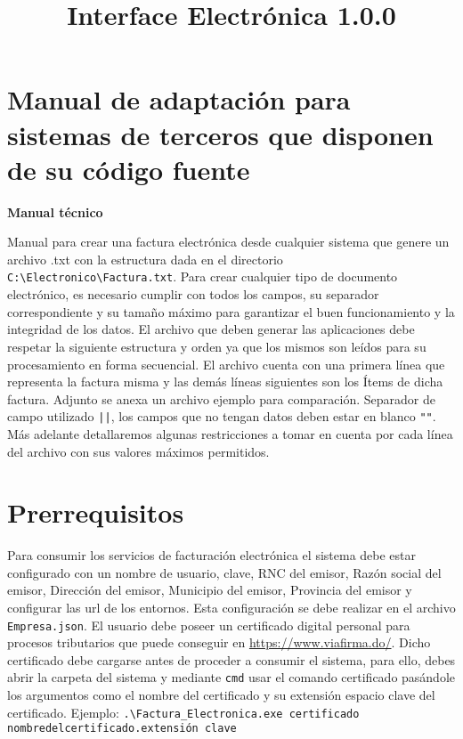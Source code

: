 \documentclass{article}
\title{Interface Electrónica 1.0.0}
\author{}
\date{}
\begin{document}
\maketitle

\section*{Manual de adaptación para sistemas de terceros que disponen de su código fuente}
\textbf{Manual técnico}

Manual para crear una factura electrónica desde cualquier sistema que genere un archivo .txt con la estructura dada en el directorio \texttt{C:\textbackslash Electronico\textbackslash Factura.txt}. Para crear cualquier tipo de documento electrónico, es necesario cumplir con todos los campos, su separador correspondiente y su tamaño máximo para garantizar el buen funcionamiento y la integridad de los datos. El archivo que deben generar las aplicaciones debe respetar la siguiente estructura y orden ya que los mismos son leídos para su procesamiento en forma secuencial. El archivo cuenta con una primera línea que representa la factura misma y las demás líneas siguientes son los Ítems de dicha factura. Adjunto se anexa un archivo ejemplo para comparación. Separador de campo utilizado \texttt{||}, los campos que no tengan datos deben estar en blanco \texttt{""}. Más adelante detallaremos algunas restricciones a tomar en cuenta por cada línea del archivo con sus valores máximos permitidos.

\section*{Prerrequisitos}
Para consumir los servicios de facturación electrónica el sistema debe estar configurado con un nombre de usuario, clave, RNC del emisor, Razón social del emisor, Dirección del emisor, Municipio del emisor, Provincia del emisor y configurar las url de los entornos. Esta configuración se debe realizar en el archivo \texttt{Empresa.json}. El usuario debe poseer un certificado digital personal para procesos tributarios que puede conseguir en \url{https://www.viafirma.do/}. Dicho certificado debe cargarse antes de proceder a consumir el sistema, para ello, debes abrir la carpeta del sistema y mediante \texttt{cmd} usar el comando certificado pasándole los argumentos como el nombre del certificado y su extensión espacio clave del certificado. Ejemplo: \texttt{.\textbackslash Factura\_Electronica.exe certificado nombredelcertificado.extensión clave}
\end{document}
